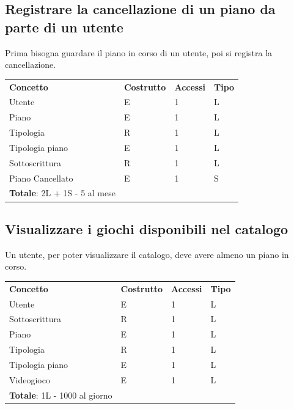 \documentclass[a4paper,12pt]{report}
\begin{document}
\newpage

\subsection*{Registrare la cancellazione di un piano da parte di un utente}

Prima bisogna guardare il piano in corso di un utente, poi si registra la cancellazione.

\begin{table}[!htb]
\begin{center}
	\begin{tabular}{ | m{5cm} P{4cm} P{4cm} P{4cm} | }
	\textbf{Concetto} & \textbf{Costrutto} & \textbf{Accessi} & \textbf{Tipo} \\
	Utente           & E & 1 & L \\ \hline
	Piano    		   & E & 1 & L \\ \hline
	Tipologia		   & R & 1 & L \\ \hline
	Tipologia piano  & E & 1 & L \\ \hline
	Sottoscrittura   & R & 1 & L \\ \hline
	Piano Cancellato & E & 1 & S \\ \hline
	\textbf{Totale}: 2L + 1S - 5 al mese & & & \\
	\hline
	\end{tabular}
\end{center}
\end{table}

\subsection*{Visualizzare i giochi disponibili nel catalogo}

Un utente, per poter visualizzare il catalogo, deve avere almeno un piano in corso.

\begin{table}[h!]
\begin{center}
	\begin{tabular}{ | m{4cm} P{4cm} P{4cm} P{4cm} | }
	\textbf{Concetto} & \textbf{Costrutto} & \textbf{Accessi} & \textbf{Tipo} \\
	Utente 		   & E & 1 & L \\ \hline
	Sottoscrittura   & R & 1 & L \\ \hline
	Piano 		   & E & 1 & L \\ \hline
	Tipologia		   & R & 1 & L \\ \hline
	Tipologia piano  & E & 1 & L \\ \hline
	Videogioco       & E & 1 & L \\ \hline
	\textbf{Totale}: 1L - 1000 al giorno & & & \\
	\hline
	\end{tabular}
\end{center}
\end{table}
\end{document}

